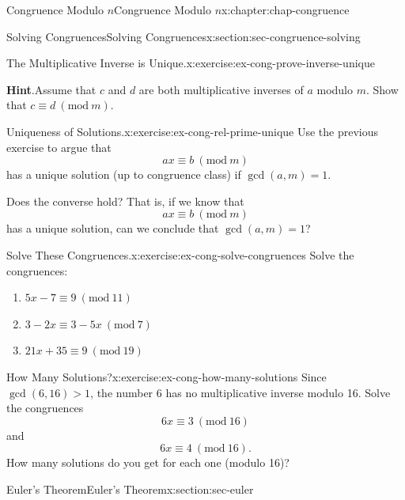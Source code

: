 \documentclass[oneside,10pt,]{book}
\newcommand{\blocktitlefont}{\relax}
\numberwithin{equation}{section}
\newcommand{\Mod}[1]{\ \left(\mathrm{mod}\ #1\right)}
\newcommand{\gt}{>}
\begin{document}
\begin{chapterptx}{Congruence Modulo \(n\)}{}{Congruence Modulo \(n\)}{}{}{x:chapter:chap-congruence}
\begin{sectionptx}{Solving Congruences}{}{Solving Congruences}{}{}{x:section:sec-congruence-solving}
\begin{inlineexercise}{The Multiplicative Inverse is Unique.}{x:exercise:ex-cong-prove-inverse-unique}
\par\smallskip%
\noindent\textbf{\blocktitlefont Hint}.\hypertarget{g:hint:id271649}{}\quad{}Assume that \(c\) and \(d\) are both multiplicative inverses of \(a\) modulo \(m\). Show that \(c \equiv d \Mod{m}\).%
\end{inlineexercise}
\begin{inlineexercise}{Uniqueness of Solutions.}{x:exercise:ex-cong-rel-prime-unique}%
Use the previous exercise to argue that%
\begin{equation*}
ax \equiv b \Mod{m}
\end{equation*}
has a unique solution (up to congruence class) if \(\gcd(a,m) = 1\).%
\par
Does the converse hold? That is, if we know that%
\begin{equation*}
ax \equiv b \Mod{m}
\end{equation*}
has a unique solution, can we conclude that \(\gcd(a,m) = 1\)?%
\end{inlineexercise}
\begin{inlineexercise}{Solve These Congruences.}{x:exercise:ex-cong-solve-congruences}%
Solve the congruences:%
\begin{enumerate}[label=(\alph*)]
\item{}\(\displaystyle 5x - 7 \equiv 9 \Mod{11}\)%
\item{}\(\displaystyle 3 - 2x \equiv 3 - 5x \Mod{7}\)%
\item{}\(\displaystyle 21x + 35 \equiv 9 \Mod{19}\)%
\end{enumerate}
%
\end{inlineexercise}
\begin{inlineexercise}{How Many Solutions?}{x:exercise:ex-cong-how-many-solutions}%
Since \(\gcd(6,16) \gt 1\), the number 6 has no multiplicative inverse modulo 16. Solve the congruences%
\begin{equation*}
6x \equiv 3 \Mod{16}
\end{equation*}
and%
\begin{equation*}
6x \equiv 4 \Mod{16}\text{.}
\end{equation*}
How many solutions do you get for each one (modulo 16)?%
\end{inlineexercise}
\end{sectionptx}
%
%
\typeout{************************************************}
\typeout{************************************************}
%
\begin{sectionptx}{Euler's Theorem}{}{Euler's Theorem}{}{}{x:section:sec-euler}

\end{sectionptx}
\end{chapterptx}
\end{document}

